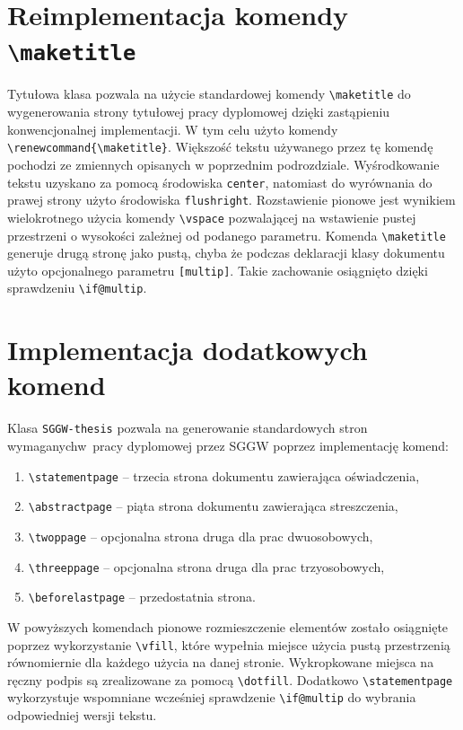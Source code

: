 \documentclass{SGGW-thesis}
\begin{document}
\section{Reimplementacja komendy {\tt \textbackslash maketitle}}
\label{sec:maketitle}
Tytułowa klasa pozwala na użycie standardowej komendy \verb|\maketitle| do wygenerowania strony tytułowej pracy dyplomowej dzięki zastąpieniu konwencjonalnej implementacji.
W tym celu użyto komendy \verb|\renewcommand{\maketitle}|.
Większość tekstu używanego przez tę komendę pochodzi ze zmiennych opisanych w poprzednim podrozdziale. Wyśrodkowanie tekstu uzyskano za pomocą środowiska \verb|center|,
natomiast do wyrównania do prawej strony użyto środowiska \verb|flushright|. Rozstawienie pionowe jest wynikiem wielokrotnego użycia komendy \verb|\vspace| pozwalającej na
wstawienie pustej przestrzeni o wysokości zależnej od podanego parametru. Komenda \verb|\maketitle| generuje drugą stronę jako pustą, chyba że podczas deklaracji klasy
dokumentu użyto opcjonalnego parametru \verb|[multip]|. Takie zachowanie osiągnięto dzięki sprawdzeniu \verb|\if@multip|.


\section{Implementacja dodatkowych komend}
\label{sec:implementacja-dodatkowych}
Klasa {\tt SGGW-thesis} pozwala na generowanie standardowych stron wymaganych\linebreak w~pracy dyplomowej przez SGGW poprzez implementację komend:
\begin{enumerate}[label=\alph*.,itemsep=0pt]
\item{\verb|\statementpage| -- trzecia strona dokumentu zawierająca oświadczenia,}
\item{\verb|\abstractpage| -- piąta strona dokumentu zawierająca streszczenia,}
\item{\verb|\twoppage| -- opcjonalna strona druga dla prac dwuosobowych,}
\item{\verb|\threeppage| -- opcjonalna strona druga dla prac trzyosobowych,}
\item{\verb|\beforelastpage| -- przedostatnia strona.}
\end{enumerate}
W powyższych komendach pionowe rozmieszczenie elementów zostało osiągnięte poprzez wykorzystanie \verb|\vfill|, które wypełnia miejsce użycia pustą przestrzenią równomiernie
dla każdego użycia na danej stronie. Wykropkowane miejsca na ręczny podpis są zrealizowane za pomocą \verb|\dotfill|. Dodatkowo \verb|\statementpage| wykorzystuje wspomniane
wcześniej sprawdzenie \verb|\if@multip| do wybrania odpowiedniej wersji tekstu.
\end{document}

